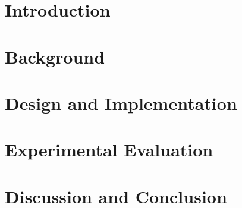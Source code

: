 \documentclass[ twoside,openright,titlepage,numbers=noenddot,headinclude,%
                footinclude=true,cleardoublepage=empty,abstractoff, %
                BCOR=5mm,paper=a4,fontsize=11pt,%
                ngerman,american,%
                ]{scrreprt}
\begin{document}
\frenchspacing
\raggedbottom
{} %
\pagestyle{plain}
%


\cleardoublepage
\pagestyle{scrheadings}
\cleardoublepage
\cleardoublepage


\part{Introduction}


\cleardoublepage
\part{Background}


\cleardoublepage
\part{Design and Implementation}


\cleardoublepage
\part{Experimental Evaluation}


\cleardoublepage
\part{Discussion and Conclusion}


\appendix
\cleardoublepage
\end{document}
